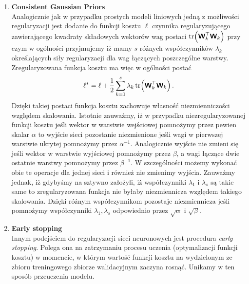 \documentclass{myclass}
\begin{document}
\begin{enumerate}
    \item \textbf{Consistent Gaussian Priors}\\
    Analogicznie jak w przypadku prostych modeli liniowych jedną z możliwości regularyzacji jest
    dodanie do funkcji kosztu \(\ell\) czynnika regularyzującego zawierającego kwadraty składowych
    wektorów wag postaci \(\tr(\boldsymbol{\mathsf{W}}_k^\top\boldsymbol{\mathsf{W}}_k)\) przy czym w ogólności przyjmujemy iż
    mamy \(s\) różnych współczynników \(\lambda_k\) określających siły regularyzacji dla wag
    łączących poszczególne warstwy. Zregularyzowana funkcja kosztu ma więc w ogólności postać
    \begin{equation*}
        \ell^* = \ell + \frac{1}{2}\sum_{k=1}^s\lambda_k \tr(\boldsymbol{\mathsf{W}}_k^\top\boldsymbol{\mathsf{W}}_k)\,.
    \end{equation*}
    Dzięki takiej postaci funkcja kosztu zachowuje własność niezmienniczości względem skalowania.
    Istotnie zauważmy, iż w przypadku niezregularyzowanej funkcji kosztu jeśli wektor w warstwie
    wejściowej pomnożymy przez pewien skalar \(\alpha\) to wyjście sieci pozostanie niezmienione
    jeśli wagi w pierwszej warstwie ukrytej pomnożymy przez \(\alpha^{-1}\). Analogicznie wyjście
    nie zmieni się jeśli wektor w warstwie wyjściowej pomnożymy przez \(\beta\), a wagi łączące dwie
    ostatnie warstwy pomnożymy przez \(\beta^{-1}\). W szczególności możemy wykonać obie te operacje
    dla jednej sieci i również nie zmienimy wyjścia. Zauważmy jednak, iż gdybyśmy na sztywno
    założyli, iż współczynniki \(\lambda_1\) i \(\lambda_s\) są takie same to zregularyzowana
    funkcja nie byłaby niezmiennicza względem takiego skalowania. Dzięki różnym współczynnikom
    pozostaje niezmiennicza jeśli pomnożymy współczynniki \(\lambda_1, \lambda_s\) odpowiednio przez
    \(\sqrt{\alpha}\) i \(\sqrt{\beta}\).

    \item \textbf{Early stopping}\\
    Innym podejściem do regularyzacji sieci neuronowych jest procedura \textit{early stopping}.
    Polega ona na zatrzymaniu procesu uczenia (optymalizacji funkcji kosztu) w momencie, w którym
    wartość funkcji kosztu na wydzielonym ze zbioru treningowego zbiorze walidacyjnym zaczyna
    rosnąć. Unikamy w ten sposób przeuczenia modelu.


\end{enumerate}
\end{document}

